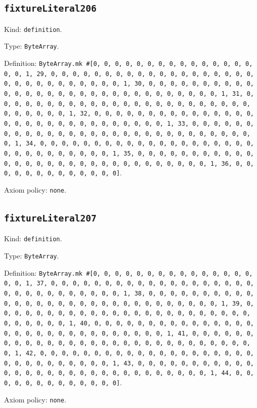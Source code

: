 \documentclass[11pt]{article}
\begin{document}
\subsection*{\texttt{fixtureLiteral206}}
\noindent Kind: \texttt{definition}.\par
\noindent Type: \texttt{ByteArray}.\par
\noindent Definition: \texttt{ByteArray.mk \#[0, 0, 0, 0, 0, 0, 0, 0, 0, 0, 0, 0, 0, 0, 0, 0, 0, 1, 29, 0, 0, 0, 0, 0, 0, 0, 0, 0, 0, 0, 0, 0, 0, 0, 0, 0, 0, 0, 0, 0, 0, 0, 0, 0, 0, 0, 0, 0, 0, 1, 30, 0, 0, 0, 0, 0, 0, 0, 0, 0, 0, 0, 0, 0, 0, 0, 0, 0, 0, 0, 0, 0, 0, 0, 0, 0, 0, 0, 0, 0, 0, 1, 31, 0, 0, 0, 0, 0, 0, 0, 0, 0, 0, 0, 0, 0, 0, 0, 0, 0, 0, 0, 0, 0, 0, 0, 0, 0, 0, 0, 0, 0, 0, 1, 32, 0, 0, 0, 0, 0, 0, 0, 0, 0, 0, 0, 0, 0, 0, 0, 0, 0, 0, 0, 0, 0, 0, 0, 0, 0, 0, 0, 0, 0, 0, 1, 33, 0, 0, 0, 0, 0, 0, 0, 0, 0, 0, 0, 0, 0, 0, 0, 0, 0, 0, 0, 0, 0, 0, 0, 0, 0, 0, 0, 0, 0, 0, 1, 34, 0, 0, 0, 0, 0, 0, 0, 0, 0, 0, 0, 0, 0, 0, 0, 0, 0, 0, 0, 0, 0, 0, 0, 0, 0, 0, 0, 0, 0, 0, 1, 35, 0, 0, 0, 0, 0, 0, 0, 0, 0, 0, 0, 0, 0, 0, 0, 0, 0, 0, 0, 0, 0, 0, 0, 0, 0, 0, 0, 0, 0, 0, 1, 36, 0, 0, 0, 0, 0, 0, 0, 0, 0, 0, 0, 0, 0]}.\par
\noindent Axiom policy: \texttt{none}.\par
\subsection*{\texttt{fixtureLiteral207}}
\noindent Kind: \texttt{definition}.\par
\noindent Type: \texttt{ByteArray}.\par
\noindent Definition: \texttt{ByteArray.mk \#[0, 0, 0, 0, 0, 0, 0, 0, 0, 0, 0, 0, 0, 0, 0, 0, 0, 1, 37, 0, 0, 0, 0, 0, 0, 0, 0, 0, 0, 0, 0, 0, 0, 0, 0, 0, 0, 0, 0, 0, 0, 0, 0, 0, 0, 0, 0, 0, 0, 1, 38, 0, 0, 0, 0, 0, 0, 0, 0, 0, 0, 0, 0, 0, 0, 0, 0, 0, 0, 0, 0, 0, 0, 0, 0, 0, 0, 0, 0, 0, 0, 1, 39, 0, 0, 0, 0, 0, 0, 0, 0, 0, 0, 0, 0, 0, 0, 0, 0, 0, 0, 0, 0, 0, 0, 0, 0, 0, 0, 0, 0, 0, 0, 1, 40, 0, 0, 0, 0, 0, 0, 0, 0, 0, 0, 0, 0, 0, 0, 0, 0, 0, 0, 0, 0, 0, 0, 0, 0, 0, 0, 0, 0, 0, 0, 1, 41, 0, 0, 0, 0, 0, 0, 0, 0, 0, 0, 0, 0, 0, 0, 0, 0, 0, 0, 0, 0, 0, 0, 0, 0, 0, 0, 0, 0, 0, 0, 1, 42, 0, 0, 0, 0, 0, 0, 0, 0, 0, 0, 0, 0, 0, 0, 0, 0, 0, 0, 0, 0, 0, 0, 0, 0, 0, 0, 0, 0, 0, 0, 1, 43, 0, 0, 0, 0, 0, 0, 0, 0, 0, 0, 0, 0, 0, 0, 0, 0, 0, 0, 0, 0, 0, 0, 0, 0, 0, 0, 0, 0, 0, 0, 1, 44, 0, 0, 0, 0, 0, 0, 0, 0, 0, 0, 0, 0, 0]}.\par
\noindent Axiom policy: \texttt{none}.\par
\end{document}
